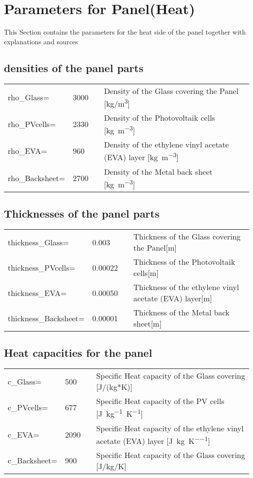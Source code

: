 

\section{Parameters for Panel(Heat)}

This Section contains the parameters for the heat side of the panel together with explanations and sources


\subsection{densities of the panel parts}
\begin{tabular}{ l l |c| l}
	rho_Glass=		&3000	&\cite{lim2017diurnal}	&Density of the Glass covering the Panel [kg/m\textsuperscript{3}]\\     	
	rho_PVcells=	&2330	&\cite{lim2017diurnal}	&Density of the Photovoltaik cells [\si{kg.m^{-3}}] \\     
	rho_EVA=		&960	&\cite{lim2017diurnal}	&Density of the ethylene vinyl acetate (EVA) layer [\si{\kilogram\per\meter^{3}}]\\
	rho_Backsheet=	&2700	&\cite{lim2017diurnal}	&Density of the Metal back sheet [\si[per-mode=fraction]{\kilogram\per\meter^{3}}]\\ 
\end{tabular}

\subsection{Thicknesses of the panel parts}
\begin{tabular}{ l l |c| l}
	thickness_Glass=	&0.003	&\cite{lim2017diurnal}&Thickness of the Glass covering the Panel[m]\\  	
	thickness_PVcells=	&0.00022&\cite{lim2017diurnal}&Thickness of the Photovoltaik cells[\si{m}]\\	
	thickness_EVA=		&0.00050&\cite{lim2017diurnal}&Thickness of the ethylene vinyl acetate (EVA) layer[\si{\meter}]\\
	thickness_Backsheet=&0.00001&\cite{lim2017diurnal}&Thickness of the Metal back sheet[m]\\ 	
\end{tabular}	

\subsection{Heat capacities for the panel}
\begin{tabular}{ l l |c| l}
	c_Glass=	&500	&\cite{lim2017diurnal}&Specific Heat capacity of the Glass covering [J/(kg*K)]\\
	c_PVcells=	&677	&\cite{lim2017diurnal}&Specific Heat capacity of the PV cells [\si{J.kg^{-1}.K^{-1}}]\\
	c_EVA=		&2090 	&\cite{lim2017diurnal}&Specific Heat capacity of the ethylene vinyl acetate (EVA) layer [\si{\joule\per\kilogram\per\kelvin}]\\
	c_Backsheet=&900	&\cite{lim2017diurnal}&Specific Heat capacity of the Glass covering  [\si[per-mode=symbol]{\joule\per\kilogram\per\kelvin}]\\	
\end{tabular}


